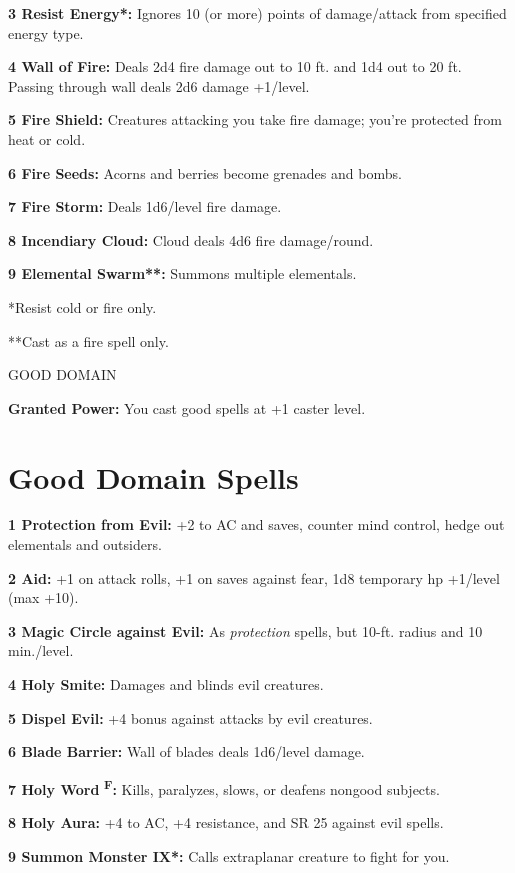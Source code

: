 \documentclass{article}
\begin{document}
\textbf{3 Resist Energy*:} Ignores 10 (or more) points of damage/attack from specified 
energy type.

\textbf{4 Wall of Fire: }Deals 2d4 fire damage out to 10 ft. and 1d4 out to 20 
ft. Passing through wall deals 2d6 damage +1/level.

\textbf{5 Fire Shield: }Creatures attacking you take fire damage; you're protected 
from heat or cold.

\textbf{6 Fire Seeds:} Acorns and berries become grenades and bombs.

\textbf{7 Fire Storm: }Deals 1d6/level fire damage.

\textbf{8 Incendiary Cloud: }Cloud deals 4d6 fire damage/round.

\textbf{9 Elemental Swarm**: }Summons multiple elementals.

*Resist cold or fire only.

**Cast as a fire spell only.

\vspace{12pt}
GOOD DOMAIN

\textbf{Granted Power:} You cast good spells at +1 caster level.

\section*{\textbf{Good Domain Spells}}

\textbf{1 Protection from Evil: }+2 to AC and saves, counter mind control, hedge 
out elementals and outsiders.

\textbf{2 Aid:} +1 on attack rolls, +1 on saves against fear, 1d8 temporary hp 
+1/level (max +10).

\textbf{3 Magic Circle against Evil: }As \textit{protection }spells, but 10-ft. 
radius and 10 min./level.

\textbf{4 Holy Smite: }Damages and blinds evil creatures.

\textbf{5 Dispel Evil: }+4 bonus against attacks by evil creatures.

\textbf{6 Blade Barrier: }Wall of blades deals 1d6/level damage.

\textbf{7 Holy Word }\textsuperscript{\textbf{F}}\textbf{:} Kills, paralyzes, slows, 
or deafens nongood subjects.

\textbf{8 Holy Aura:} +4 to AC, +4 resistance, and SR 25 against evil spells.

\textbf{9 Summon Monster IX*:} Calls extraplanar creature to fight for you.
\end{document}
